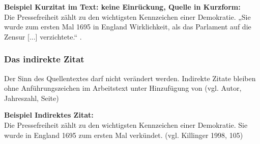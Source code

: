 \documentclass[a4paper, 12pt, xcolor=dvipsnames]{scrartcl}		%
\begin{document}
\textbf{Beispiel Kurzitat im Text: keine Einrückung, Quelle in Kurzform:}\\
Die Pressefreiheit zählt zu den wichtigsten Kennzeichen einer Demokratie. „Sie wurde zum ersten Mal
1695 in England Wirklichkeit, als das Parlament auf die Zensur [...] verzichtete.“ \cite[S~105]{11_Killinger}.

\subsubsection{Das indirekte Zitat}
\begin{Merksatz}
Der Sinn des Quellentextes darf nicht verändert werden. Indirekte Zitate bleiben ohne Anführungszeichen im Arbeitstext unter Hinzufügung von (vgl. Autor, Jahreszahl, Seite)
\end{Merksatz}
%
\textbf{Beispiel Indirektes Zitat:}\\
Die Pressefreiheit zählt zu den wichtigsten Kennzeichen einer Demokratie. Sie wurde in England
1695 zum ersten Mal verkündet. (vgl. Killinger 1998, 105)
\newpage


%
% 
%
%
%
\end{document}
